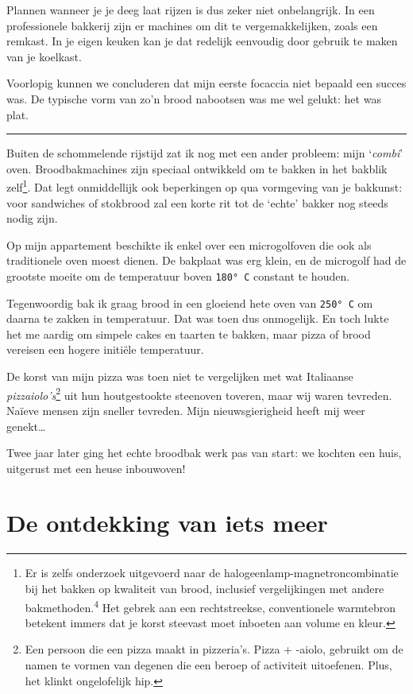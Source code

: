 \documentclass[
  11pt,
  dutch,
]{memoir}
\begin{document}
Plannen wanneer je je deeg laat rijzen is dus zeker niet onbelangrijk.
In een professionele bakkerij zijn er machines om dit te
vergemakkelijken, zoals een remkast. In je eigen keuken kan je dat
redelijk eenvoudig door gebruik te maken van je koelkast.

Voorlopig kunnen we concluderen dat mijn eerste focaccia niet bepaald
een succes was. De typische vorm van zo'n brood nabootsen was me wel
gelukt: het was plat.

\pfbreak

Buiten de schommelende rijstijd zat ik nog met een ander probleem: mijn
`\emph{combi}' oven. Broodbakmachines zijn speciaal ontwikkeld om te
bakken in het bakblik zelf\footnote{Er is zelfs onderzoek uitgevoerd
  naar de halogeenlamp-magnetroncombinatie bij het bakken op kwaliteit
  van brood, inclusief vergelijkingen met andere
  bakmethoden.\textsuperscript{4} Het gebrek aan een rechtstreekse,
  conventionele warmtebron betekent immers dat je korst steevast moet
  inboeten aan volume en kleur.}. Dat legt onmiddellijk ook beperkingen
op qua vormgeving van je bakkunst: voor sandwiches of stokbrood zal een
korte rit tot de `echte' bakker nog steeds nodig zijn.

Op mijn appartement beschikte ik enkel over een microgolfoven die ook
als traditionele oven moest dienen. De bakplaat was erg klein, en de
microgolf had de grootste moeite om de temperatuur boven
\texttt{180°\ C} constant te houden.

Tegenwoordig bak ik graag brood in een gloeiend hete oven van
\texttt{250°\ C} om daarna te zakken in temperatuur. Dat was toen dus
onmogelijk. En toch lukte het me aardig om simpele cakes en taarten te
bakken, maar pizza of brood vereisen een hogere initiële temperatuur.

De korst van mijn pizza was toen niet te vergelijken met wat Italiaanse
\emph{pizzaiolo's}\footnote{Een persoon die een pizza maakt in
  pizzeria's. Pizza + -aiolo, gebruikt om de namen te vormen van degenen
  die een beroep of activiteit uitoefenen. Plus, het klinkt ongelofelijk
  hip.} uit hun houtgestookte steenoven toveren, maar wij waren
tevreden. Naïeve mensen zijn sneller tevreden. Mijn nieuwsgierigheid
heeft mij weer genekt\ldots{}

Twee jaar later ging het echte broodbak werk pas van start: we kochten
een huis, uitgerust met een heuse inbouwoven!

\hypertarget{de-ontdekking-van-iets-meer}{%
\section{De ontdekking van iets
meer}\label{de-ontdekking-van-iets-meer}}
\end{document}
